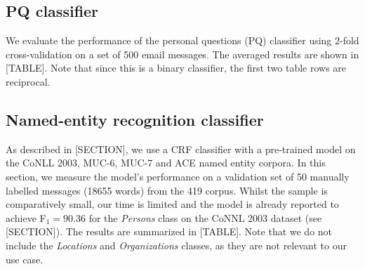 \subsection{PQ classifier}
We evaluate the performance of the personal questions (PQ) classifier using 2-fold cross-validation on a set of 500 email messages. The averaged results are shown in [TABLE]. Note that since this is a binary classifier, the first two table rows are reciprocal.
\begin{center}
\end{center}
\subsection{Named-entity recognition classifier}
As described in [SECTION], we use a CRF classifier with a pre-trained model on the CoNLL 2003, MUC-6, MUC-7 and ACE named entity corpora. In this section, we measure the model's performance on a validation set of 50 manually labelled messages (18655 words) from the 419 corpus. Whilst the sample is comparatively small, our time is limited and the model is already reported to achieve F$_{1} = 90.36$ for the \emph{Persons} class on the CoNNL 2003 dataset (see [SECTION]). The results are summarized in [TABLE]. Note that we do not include the \emph{Locations} and \emph{Organizations} classes, as they are not relevant to our use case.
\begin{center}
\end{center}

